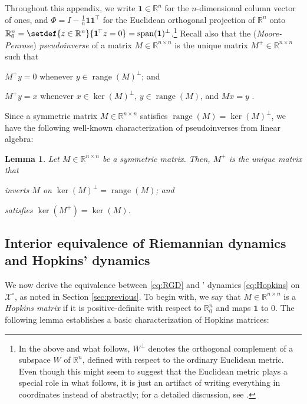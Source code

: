 \documentclass[reqno]{amsart}
\theoremstyle{plain}
\newtheorem{lemma}[theorem]{Lemma}
\theoremstyle{definition}
\theoremstyle{remark}
\numberwithin{equation}{section}
\numberwithin{theorem}{section}
\begin{document}
Throughout this appendix, we write ${\mathbf{1}}\in{{\mathbb{R}}^{n}}$ for the $n$-dimensional column vector of ones, and ${\Phi} = I - \frac1n{\mathbf{1}}{\mathbf{1}}^{{\!\top}}$ for the Euclidean orthogonal projection of ${{\mathbb{R}}^{n}}$ onto ${{\mathbb{R}}_{0}^{n}} = \setdef{z\in{{\mathbb{R}}^{n}}}{{\mathbf{1}}^{{\!\top}} z = 0} = \operatorname{span}({\mathbf{1}})^{\bot}$.\footnote{In the above and what follows, $W^{\bot}$ denotes the orthogonal complement of a subspace $W$ of ${{\mathbb{R}}^{n}}$, defined with respect to the ordinary Euclidean metric.
Even though this might seem to suggest that the Euclidean metric plays a special role in what follows, it is just an artifact of writing everything in coordinates instead of abstractly;
for a detailed discussion, see \cite{Lan87}.}
Recall also that the (\emph{Moore-Penrose}) \emph{pseudoinverse} of a matrix $M \in {{\mathbb{R}}^{n\times n}}$ is the unique matrix $M^+\in {{\mathbb{R}}^{n\times n}}$ such that
\begin{inparaenum}
\item
$M^{+} y = 0$ whenever $y\in\operatorname{range}(M)^{\bot}$;
and
\item
$M^{+}y = x$ whenever $x\in \ker(M)^{\bot}$, $y\in\operatorname{range}(M)$, and $Mx = y$ \citep[Sec.~6.7]{FIS02}.
\end{inparaenum}
Since a symmetric matrix $M\in{{\mathbb{R}}^{n\times n}}$ satisfies $\operatorname{range}(M) = \ker(M)^{\bot}$, we have the following well-known characterization of pseudoinverses from linear algebra:

\begin{lemma}
\label{lem:pseudo}
Let $M\in {{\mathbb{R}}^{n\times n}}$ be a symmetric matrix.
Then, $M^{+}$ is the unique matrix that
\begin{inparaenum}
\item
inverts $M$ on $\ker(M)^{\bot} = \operatorname{range}(M)$;
and
\item
satisfies $\ker(M^{+}) = \ker(M)$.
\end{inparaenum}
\end{lemma}

\subsection{Interior equivalence of Riemannian dynamics and Hopkins' dynamics}
\label{sec:Hopkins}

We now derive the equivalence between \eqref{eq:RGD} and \citeauthor{Hop99b}' dynamics \eqref{eq:Hopkins} on ${{\mathcal{X}}^{\circ}}$, as noted in Section \ref{sec:previous}.
To begin with, we say that ${M}\in{{\mathbb{R}}^{n\times n}}$ is a \emph{Hopkins matrix} if it is positive-definite  with respect to ${{\mathbb{R}}_{0}^{n}}$ and maps ${\mathbf{1}}$ to $0$.
The following lemma establishes a basic characterization of Hopkins matrices:
\end{document}
